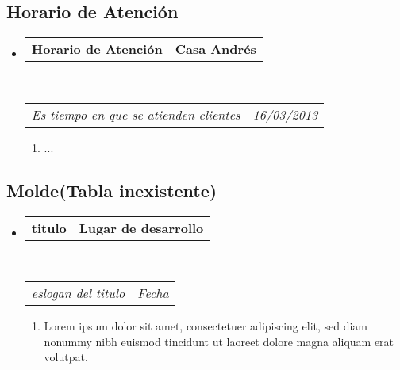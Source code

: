 \documentclass[10pt,letterpaper]{article}
\makeatletter
\newcommand{\headerrow}[2]
{\begin{tabular*}{\linewidth}{l@{\extracolsep{\fill}}r}
	#1 &
	#2 \\
\end{tabular*}}
\makeatother
\begin{document}
\subsection*{Horario de Atención}

\begin{itemize}
	\parskip=0.1em

	\item
	\headerrow
		{\textbf{Horario de Atención}}
		{\textbf{Casa Andrés}}
	\\
	\headerrow
		{\emph{Es tiempo en que se atienden clientes}}
		{\emph{16/03/2013}}
	\begin{enumerate}
		\item ...
	\end{enumerate}

\end{itemize}

\subsection*{Molde(Tabla inexistente)}

\begin{itemize}
	\parskip=0.1em

	\item
	\headerrow
		{\textbf{titulo}}
		{\textbf{Lugar de desarrollo}}
	\\
	\headerrow
		{\emph{eslogan del titulo}}
		{\emph{Fecha}}
	\begin{enumerate}
		\item Lorem ipsum dolor sit amet, consectetuer adipiscing elit, sed
		diam nonummy nibh euismod tincidunt ut laoreet dolore magna aliquam
		erat volutpat.
	\end{enumerate}

\end{itemize}
\end{document}
